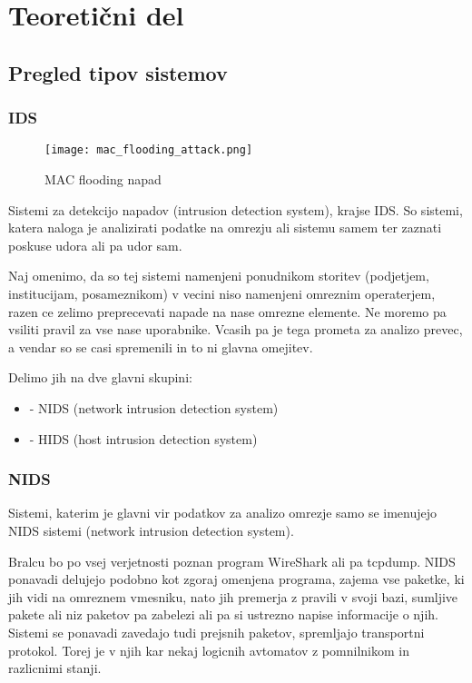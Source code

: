 \documentclass[12pt]{article}
\let\stdsection\section
\renewcommand\section{\newpage\stdsection}
\begin{document}
\section{Teoretični del}

\subsection{Pregled tipov sistemov}
 
\subsubsection{IDS}

\begin{figure}[htb]
\begin{center}
\texttt{[image: mac\_flooding\_attack.png]}
\end{center}
\caption{MAC flooding napad}
\label{mac_flooding}
\end{figure}

Sistemi za detekcijo napadov (intrusion detection system), krajse IDS.
So sistemi, katera naloga je analizirati podatke na omrezju ali sistemu samem
ter zaznati poskuse udora ali pa udor sam.

Naj omenimo, da so tej sistemi namenjeni ponudnikom storitev (podjetjem, institucijam, posameznikom) v vecini niso namenjeni omreznim operaterjem, razen ce zelimo preprecevati napade na nase omrezne elemente. 
Ne moremo pa vsiliti pravil za vse nase uporabnike. Vcasih pa je tega prometa za analizo prevec, a vendar so se casi spremenili in to ni glavna omejitev.

Delimo jih na dve glavni skupini:

\begin{itemize}
    \item - NIDS (network intrusion detection system)
    \item - HIDS (host intrusion detection system)
\end{itemize}

\subsubsection{NIDS}

Sistemi, katerim je glavni vir podatkov za analizo omrezje samo se imenujejo NIDS sistemi (network intrusion detection system).

Bralcu bo po vsej verjetnosti poznan program WireShark ali pa tcpdump.
NIDS ponavadi delujejo podobno kot zgoraj omenjena programa, zajema vse paketke, ki jih vidi na omreznem vmesniku, nato jih premerja z pravili v svoji bazi, sumljive pakete ali niz paketov pa zabelezi ali pa si ustrezno napise informacije o njih.
Sistemi se ponavadi zavedajo tudi prejsnih paketov, spremljajo transportni protokol. Torej je v njih kar nekaj logicnih avtomatov z pomnilnikom in razlicnimi stanji.
\end{document}
